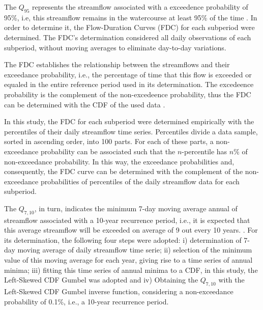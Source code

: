         The $Q_{95}$ represents the streamflow associated with a exceedence probability of 95\%, i.e, this streamflow remains in the watercourse at least 95\% of the time \citep{Abreu2022}. In order to determine it, the Flow-Duration Curves (FDC) for each subperiod were determined. The FDC's determination considered all daily observations of each subperiod, without moving averages to eliminate day-to-day variations.

        The FDC establishes the relationship between the streamflows and their exceedance probability, i.e., the percentage of time that this flow is exceeded or equaled in the entire reference period used in its determination. The excedeence probability is the complement of the non-excedeence probability, thus the FDC can be determined with the CDF of the used data \citep{Abreu2022, Verma2016}.

        In this study, the FDC for each subperiod were determined empirically with the percentiles of their daily streamflow time series. Percentiles divide a data sample, sorted in ascending order, into 100 parts. For each of these parts, a non-exceedance probability can be associated such that the $n$-percentile has $n\%$ of non-exceedance probability. In this way, the exceedance probabilities and, consequently, the FDC curve can be determined with the complement of the non-exceedance probabilities of percentiles of the daily streamflow data for each subperiod.

        The $Q_{7,10}$, in turn, indicates the minimum 7-day moving average annual of streamflow associated with a 10-year recurrence period, i.e., it is expected that this average streamflow will be exceeded on average of 9 out every 10 years. \citep{Reilly2003}. For its determination, the following four steps were adopted: i) determination of 7-day moving average of daily streamflow time serie; ii) selection of the minimum value of this moving average for each year, giving rise to a time series of annual minima; iii) fitting this time series of annual minima to a CDF, in this study, the Left-Skewed CDF Gumbel was adopted and iv) Obtaining the $Q_{7,10}$ with the Left-Skewed CDF Gumbel inverse function, considering a non-exceedance probability of 0.1\%, i.e., a 10-year recurrence period.

    
